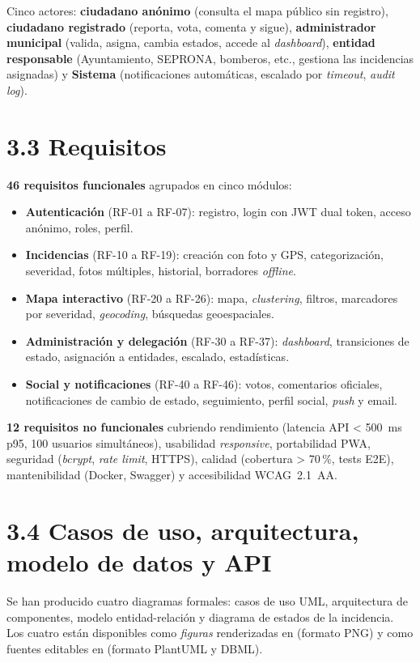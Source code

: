 Cinco actores: \textbf{ciudadano anónimo} (consulta el mapa público sin registro), \textbf{ciudadano registrado} (reporta, vota, comenta y sigue), \textbf{administrador municipal} (valida, asigna, cambia estados, accede al \textit{dashboard}), \textbf{entidad responsable} (Ayuntamiento, SEPRONA, bomberos, etc., gestiona las incidencias asignadas) y \textbf{Sistema} (notificaciones automáticas, escalado por \textit{timeout}, \textit{audit log}).


\section*{3.3 Requisitos}

\textbf{46 requisitos funcionales} agrupados en cinco módulos:

\begin{itemize}[leftmargin=1.2cm, itemsep=2pt]
  \item \textbf{Autenticación} (RF-01 a RF-07): registro, login con JWT dual token, acceso anónimo, roles, perfil.
  \item \textbf{Incidencias} (RF-10 a RF-19): creación con foto y GPS, categorización, severidad, fotos múltiples, historial, borradores \textit{offline}.
  \item \textbf{Mapa interactivo} (RF-20 a RF-26): mapa, \textit{clustering}, filtros, marcadores por severidad, \textit{geocoding}, búsquedas geoespaciales.
  \item \textbf{Administración y delegación} (RF-30 a RF-37): \textit{dashboard}, transiciones de estado, asignación a entidades, escalado, estadísticas.
  \item \textbf{Social y notificaciones} (RF-40 a RF-46): votos, comentarios oficiales, notificaciones de cambio de estado, seguimiento, perfil social, \textit{push} y email.
\end{itemize}

\textbf{12 requisitos no funcionales} cubriendo rendimiento (latencia API < 500~ms p95, 100 usuarios simultáneos), usabilidad \textit{responsive}, portabilidad PWA, seguridad (\textit{bcrypt}, \textit{rate limit}, HTTPS), calidad (cobertura > 70\,\%, tests E2E), mantenibilidad (Docker, Swagger) y accesibilidad WCAG~2.1~AA.


\section*{3.4 Casos de uso, arquitectura, modelo de datos y API}

Se han producido cuatro diagramas formales: casos de uso UML, arquitectura de componentes, modelo entidad-relación y diagrama de estados de la incidencia. Los cuatro están disponibles como \textit{figuras} renderizadas en  (formato PNG) y como fuentes editables en  (formato PlantUML y DBML).

